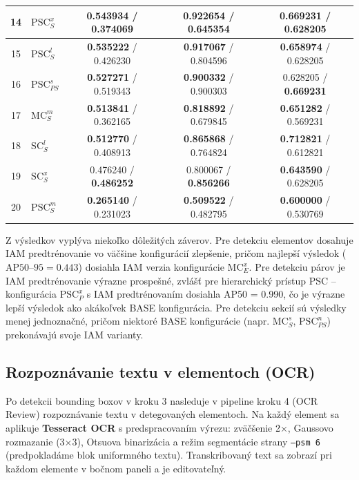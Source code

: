 \begin{table}[t]
\begin{tabular}{|c|l|c|c|c|}
 \hline 14 & $\mathrm{PSC}_{S}^{x}$ & \textbf{0.543934} / 0.374069 & \textbf{0.922654} / 0.645354 & \textbf{0.669231} / 0.628205 \\
 \hline 15 & $\mathrm{PSC}_{S}^{l}$ & \textbf{0.535222} / 0.426230 & \textbf{0.917067} / 0.804596 & \textbf{0.658974} / 0.628205 \\
 \hline 16 & $\mathrm{PSC}_{PS}^{s}$ & \textbf{0.527271} / 0.519343 & \textbf{0.900332} / 0.900303 & 0.628205 / \textbf{0.669231} \\
 \hline 17 & $\mathrm{MC}_{S}^{m}$ & \textbf{0.513841} / 0.362165 & \textbf{0.818892} / 0.679845 & \textbf{0.651282} / 0.569231 \\
 \hline 18 & $\mathrm{SC}_{S}^{l}$ & \textbf{0.512770} / 0.408913 & \textbf{0.865868} / 0.764824 & \textbf{0.712821} / 0.612821 \\
 \hline 19 & $\mathrm{SC}_{S}^{x}$ & 0.476240 / \textbf{0.486252} & 0.800067 / \textbf{0.856266} & \textbf{0.643590} / 0.628205 \\
 \hline 20 & $\mathrm{PSC}_{S}^{m}$ & \textbf{0.265140} / 0.231023 & \textbf{0.509522} / 0.482795 & \textbf{0.600000} / 0.530769 \\
 \hline
 \end{tabular}
 \label{tab:sections}
\end{table}

Z výsledkov vyplýva niekoľko dôležitých záverov. Pre detekciu elementov dosahuje IAM predtrénovanie vo väčšine konfigurácií zlepšenie, pričom najlepší výsledok ($\text{AP50--95} = 0.443$) dosiahla IAM verzia konfigurácie $\mathrm{MC}_{E}^{x}$. Pre detekciu párov je IAM predtrénovanie výrazne prospešné, zvlášť pre hierarchický prístup PSC – konfigurácia $\mathrm{PSC}_{P}^{x}$ s IAM predtrénovaním dosiahla AP50 = 0.990, čo je výrazne lepší výsledok ako akákoľvek BASE konfigurácia. Pre detekciu sekcií sú výsledky menej jednoznačné, pričom niektoré BASE konfigurácie (napr. $\mathrm{MC}_{S}^{s}$, $\mathrm{PSC}_{PS}^{n}$) prekonávajú svoje IAM varianty.

\subsection{Rozpoznávanie textu v elementoch (OCR)}

Po detekcii bounding boxov v kroku 3 nasleduje v pipeline kroku 4 (OCR Review) rozpoznávanie textu v detegovaných elementoch. Na každý element sa aplikuje \textbf{Tesseract OCR} s predspracovaním výrezu: zväčšenie 2×, Gaussovo rozmazanie (3×3), Otsuova binarizácia a režim segmentácie strany \texttt{--psm 6} (predpokladáme blok uniformného textu). Transkribovaný text sa zobrazí pri každom elemente v bočnom paneli a je editovateľný.

